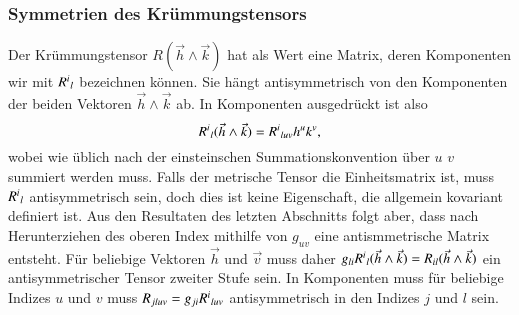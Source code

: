 \subsubsection{Symmetrien des Krümmungstensors}
Der Krümmungstensor $R(\vec{h}\wedge\vec{k})$ hat als Wert eine Matrix,
deren Komponenten wir mit $R^i\mathstrut_l$ bezeichnen können.
Sie hängt antisymmetrisch von den Komponenten der beiden Vektoren
$\vec{h}\wedge\vec{k}$ ab.
In Komponenten ausgedrückt ist also
\[
R^i\mathstrut_l(\vec{h}\wedge\vec{k})
=
R^i\mathstrut_{luv} h^uk^v,
\]
wobei wie üblich nach der einsteinschen Summationskonvention über $u$
$v$ summiert werden muss.
Falls der metrische Tensor die Einheitsmatrix ist, muss $R^i\mathstrut_l$
antisymmetrisch sein, doch dies ist keine Eigenschaft, die allgemein
kovariant definiert ist.
Aus den Resultaten des letzten Abschnitts folgt aber, dass nach
Herunterziehen des oberen Index mithilfe von $g_{uv}$ eine
antismmetrische Matrix entsteht.
Für beliebige Vektoren $\vec{h}$ und $\vec{v}$ muss daher
$g_{li}R^i\mathstrut_l(\vec{h}\wedge\vec{k})=R_{il}(\vec{h}\wedge\vec{k})$
ein antisymmetrischer Tensor zweiter Stufe sein.
In Komponenten muss für beliebige Indizes $u$ und $v$ muss
$R_{jluv}=g_{ji}R^i\mathstrut_{luv}$ antisymmetrisch in den
Indizes $j$ und $l$ sein.

